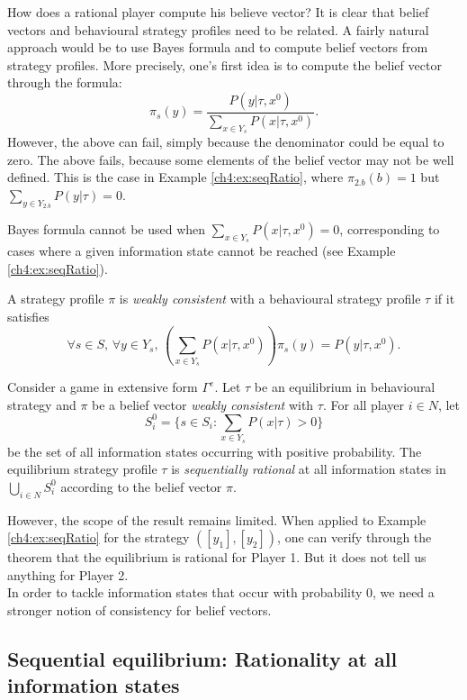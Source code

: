 How does a rational player compute his believe vector?
It is clear that belief vectors and behavioural strategy profiles need to be related. A fairly natural approach  would be to use Bayes formula and to compute belief vectors from strategy profiles.
More precisely, one's first idea is to compute the belief vector through the formula:
$$ \pi_s(y) = \frac{P(y | \tau, x^0)}{\sum_{x \in Y_s} P(x | \tau, x^0)}. $$
However, the above can fail, simply because the denominator could be equal to zero. The above fails, because some elements of the belief vector may not be well defined. This is the case in Example \ref{ch4:ex:seqRatio}, where $\pi_{2.b}(b) = 1$ but  $ \sum_{y \in Y_{2.b}} P(y | \tau) = 0$.

Bayes formula cannot be used when $\sum_{x \in Y_s} P(x | \tau, x^0) = 0$, corresponding to cases where a given information state cannot be reached (see Example \ref{ch4:ex:seqRatio}).

\begin{definition}
A strategy profile $\pi$ is \emph{weakly consistent} with a behavioural strategy profile $\tau$  if it
satisfies
$$\forall s \in S, \, \forall y \in Y_s, \, \left (\sum_{x \in Y_s} P(x | \tau, x^0)\right ) \pi_s(y) =  P(y | \tau, x^0).$$
\end{definition}

\begin{theorem}
Consider a game in extensive form $\Gamma^e$. Let $\tau$ be an equilibrium in behavioural strategy and $\pi$ be a belief vector \emph{weakly consistent} with $\tau$.
For all player $i \in N$, let
$$
S^0_i = \{s \in S_i : \sum_{x \in Y_s} P(x| \tau) > 0\}
$$
be the set of all information states occurring with positive probability.
The equilibrium strategy profile $\tau$ is \emph{sequentially rational} at all information states in $\bigcup_{i \in N} S^0_i$ according to the belief vector $\pi$.
\label{ch4:th:WeakRatio}
\end{theorem}

However, the scope of the result remains limited. When applied to Example \ref{ch4:ex:seqRatio} for the strategy $([y_1],[y_2])$, one can verify through the theorem that the equilibrium is rational for Player 1. But it does not tell us anything for Player 2.\\
In order to tackle information states that occur with probability 0, we need a stronger notion of consistency for belief vectors.

\subsection{Sequential equilibrium: Rationality at all information states}

